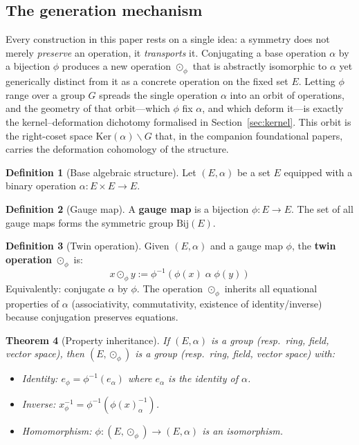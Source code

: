 \documentclass[12pt]{article}
\theoremstyle{plain}
\newtheorem{theorem}{Theorem}[section]
\theoremstyle{definition}
\newtheorem{definition}[theorem]{Definition}
\theoremstyle{remark}
\newcommand{\Ker}{\mathrm{Ker}}
\begin{document}
\subsection{The generation mechanism}

Every construction in this paper rests on a single idea: a symmetry does not merely \emph{preserve} an
operation, it \emph{transports} it. Conjugating a base operation $\alpha$ by a bijection $\phi$ produces a new
operation $\odot_\phi$ that is abstractly isomorphic to $\alpha$ yet generically distinct from it as a concrete
operation on the fixed set $E$. Letting $\phi$ range over a group $G$ spreads the single operation $\alpha$ into
an orbit of operations, and the geometry of that orbit---which $\phi$ fix $\alpha$, and which deform it---is
exactly the kernel--deformation dichotomy formalised in Section~\ref{sec:kernel}. This orbit is the right-coset
space $\Ker(\alpha)\backslash G$ that, in the companion foundational papers, carries the deformation cohomology
of the structure.

\begin{definition}[Base algebraic structure]\label{def:base}
Let $(E, \alpha)$ be a set $E$ equipped with a binary operation $\alpha: E \times E \to E$.
\end{definition}

\begin{definition}[Gauge map]\label{def:gauge}
A \textbf{gauge map} is a bijection $\phi: E \to E$. The set of all gauge maps forms the symmetric group $\mathrm{Bij}(E)$.
\end{definition}

\begin{definition}[Twin operation]\label{def:twin-op}
Given $(E, \alpha)$ and a gauge map $\phi$, the \textbf{twin operation} $\odot_\phi$ is:
\begin{equation}\label{eq:twin-def}
\boxed{x \odot_\phi y := \phi^{-1}(\phi(x) \;\alpha\; \phi(y))}
\end{equation}
Equivalently: conjugate $\alpha$ by $\phi$. The operation $\odot_\phi$ inherits all equational properties of $\alpha$ (associativity, commutativity, existence of identity/inverse) because conjugation preserves equations.
\end{definition}

\begin{theorem}[Property inheritance]\label{thm:inheritance}
If $(E, \alpha)$ is a group (resp.\ ring, field, vector space), then $(E, \odot_\phi)$ is a group (resp.\ ring, field, vector space) with:
\begin{itemize}
    \item Identity: $e_\phi = \phi^{-1}(e_\alpha)$ where $e_\alpha$ is the identity of $\alpha$.
    \item Inverse: $x^{-1}_\phi = \phi^{-1}(\phi(x)^{-1}_\alpha)$.
    \item Homomorphism: $\phi: (E, \odot_\phi) \to (E, \alpha)$ is an isomorphism.
\end{itemize}
\end{theorem}
\end{document}
